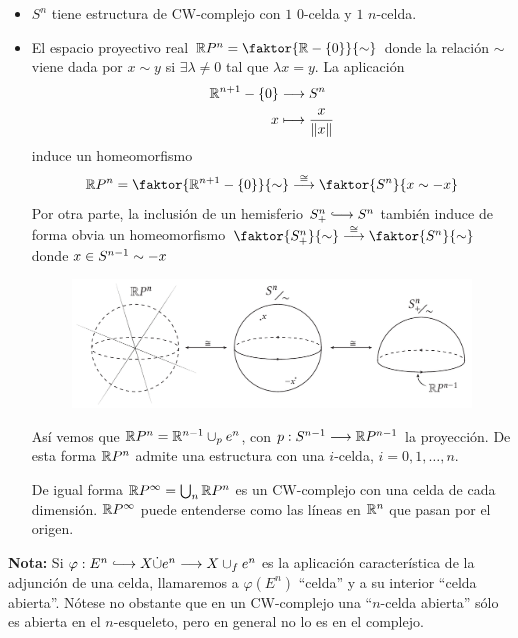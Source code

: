 \begin{ejems}
\begin{itemize}
\item $S^n$ tiene estructura de CW-complejo con $1$ $0$-celda y $1$ $n$-celda.
\item El espacio proyectivo real $\mathbb{R}P^n = \faktor{\bb{R}-\{0\}}{\sim}$ donde la relación $\sim$ viene dada por $x \sim y$ si $\exists \lambda \neq 0$ tal que $\lambda x = y$. La aplicación 
\begin{align*}
\bb{R}^{n+1} - \{0\} &\longrightarrow S^n \\
x &\longmapsto \frac{x}{\|x\|}
\end{align*}
induce un homeomorfismo
\[ \bb{R}P^n = \faktor{\bb{R}^{n+1} -\{0\}}{\sim} \stackrel{\cong}{\longrightarrow} \faktor{S^n}{x \sim -x} \]
Por otra parte, la inclusión de un hemisferio $S_+^n \longhookrightarrow S^n$ también induce de forma obvia un homeomorfismo $\faktor{S_+^n}{\sim} \stackrel{\cong}{\longrightarrow} \faktor{S^n}{\sim}$ donde $x \in S^{n-1} \sim \nobreak -x$ \par
\begin{figure}[h]
\centering
\includegraphics[width=\textwidth]{images/proyecreal.pdf}
\end{figure}
\par 
Así vemos que $\mathbb{R}P^n = \mathbb{R}^{n-1} \cup_p e^n$, con $p : S^{n-1} \longrightarrow \bb{R}P^{n-1}$ la proyección. De esta forma $\mathbb{R}P^n$ admite una estructura con una $i$-celda, $i = 0, 1, \ldots ,n$. \par 
De igual forma $\mathbb{R}P^\infty = \bigcup_n \mathbb{R}P^n$ es un CW-complejo con una celda de cada dimensión. $\mathbb{R}P^\infty$ puede entenderse como las líneas en $\mathbb{R}^n$ que pasan por el origen.
\end{itemize}
\textbf{Nota:} Si $\varphi : E^n \longhookrightarrow X \dot{\cup} e^n \longrightarrow X \cup_f e^n$ es la aplicación característica de la adjunción de una celda, llamaremos a $\varphi(E^n)$ ``celda'' y a su interior ``celda abierta''. Nótese no obstante que en un CW-complejo una ``$n$-celda abierta'' sólo es abierta en el $n$-esqueleto, pero en general no lo es en el complejo.
\end{ejems}


